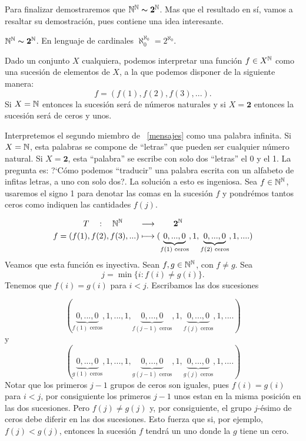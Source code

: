 Para finalizar demostraremos que
$\mathbb{N}^{\mathbb{N}}\thicksim\mathbf{2}^{\mathbb{N}}$. Mas que el resultado en
sí, vamos a resaltar su demostración, pues contiene una
idea interesante.

\begin{proposicion} $\mathbb{N}^{\mathbb{N}}\thicksim\mathbf{2}^{\mathbb{N}}$. En lenguaje de cardinales  $\aleph_0^{\aleph_0}=2^{\aleph_0}$.
\end{proposicion}

\begin{demo} Dado un conjunto $X$ cualquiera, podemos interpretar una
función $f\in X^{\mathbb{N}}$ como una sucesión de elementos de $X$,
a la que podemos disponer de la siguiente manera:
\begin{equation}\label{mensajes}
     f=(f(1),f(2),f(3),...).
\end{equation}
Si $X=\mathbb{N}$ entonces la sucesión será de números naturales y
si $X=\mathbf{2}$ entonces la sucesión será de ceros y unos.

Interpretemos el segundo miembro de ~\eqref{mensajes}  como una
palabra infinita. Si $X=\mathbb{N}$, esta palabras se compone de
``letras'' que pueden ser cualquier número natural. Si
$X=\mathbf{2}$, esta ``palabra'' se escribe con solo dos
``letras'' el 0 y el 1. La pregunta es: ?`Cómo podemos
``traducir'' una palabra escrita con un alfabeto de infitas
letras, a uno con solo dos?. La solución a esto es ingeniosa.
Sea $f\in\mathbb{N}^{\mathbb{N}}$, usaremos el signo 1 para denotar las comas en
la sucesión $f$ y pondrémos tantos ceros como indiquen las
cantidades $f(j)$.


\[
  \begin{split}
         T\quad:\quad\mathbb{N}^{\mathbb{N}}\quad\quad &\longrightarrow\quad\quad\mathbf{2}^{\mathbb{N}}\\
         f=(f(1),f(2),f(3),...)&\longmapsto
          (\underbrace{0,...,0}_{f(1)\,\,\text{ceros}},1,
          \underbrace{0,...,0}_{f(2)\,\,\text{ceros}},1,....)\\
 \end{split}
\]
Veamos que esta función es inyectiva. Sean $f,g\in\mathbb{N}^{\mathbb{N}}$,
con  $f\neq g$. Sea
\[j=\min\{i:f(i)\neq g(i)\}.\]
Tenemos que $f(i)=g(i)$ para $i<j$. Escribamos las dos sucesiones

\[   (\underbrace{0,...,0}_{f(1)\,\,\text{ceros}},1,
         ...,1,\underbrace{0,...,0}_{f(j-1)
          \,\,\text{ceros}},1, \underbrace{0,...,0}_{f(j)\,\,\text{ceros}},1,....)
\]
y
\[   (\underbrace{0,...,0}_{g(1)\,\,\text{ceros}},1,
         ...,1,\underbrace{0,...,0}_{g(j-1)
          \,\,\text{ceros}},1, \underbrace{0,...,0}_{g(j)\,\,\text{ceros}},1,....)
\]
Notar que los primeros $j-1$ grupos de ceros son iguales, pues
$f(i)=g(i)$ para $i<j$, por consiguiente los primeros $j-1$ unos
estan en la misma posición en las dos sucesiones. Pero $f(j)\neq
g(j)$ y, por consiguiente, el grupo $j$-ésimo de ceros debe
diferir en las dos sucesiones. Esto fuerza que si, por ejemplo,
$f(j)<g(j)$, entonces la sucesión $f$ tendrá un uno donde la
$g$ tiene un cero.


\end{demo}
